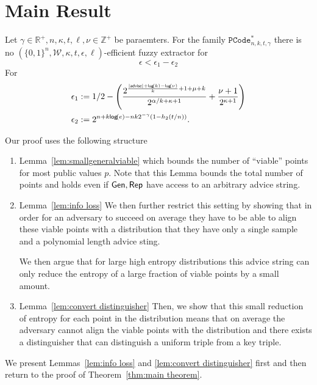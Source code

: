 

\section{Main Result}
\begin{theorem}
Let $\gamma \in\mathbb{R}^+, n, \kappa, t, \ell, \nu \in\mathbb{Z}^+$ be paraemters.
For the  family $ \mathtt{PCode}_{n, k, t, \gamma}^{*}$ there is no $(\{0,1\}^n, \mathcal{W}, \kappa, t, \epsilon, \ell)$-efficient fuzzy extractor for 
\[
\epsilon< \epsilon_1-\epsilon_2
\]
For 
\begin{align*}\epsilon_1&:= 1/2-\left(\frac{2^{\frac{|{\mathsf{advise}}|+\mathsf{log}\!\left(k\right)-\mathsf{log}\!\left(\nu\right)}{k}+1+\mu+k}}{{2^{\alpha/k+\kappa+1}}}+\frac{\nu+1}{2^{\kappa+1}}\right)\\\epsilon_2 &:=2^{n+k\mathsf{log}\!\left(e\right)- nk2^{-\gamma}(1-h_2(t/n))}.\end{align*}
\label{thm:main theorem}
\end{theorem}

Our proof uses the following structure
\begin{enumerate}
\item Lemma~\ref{lem:smallgeneralviable} which bounds the number of ``viable'' points for most public values $p$.  Note that this Lemma bounds the total number of points and holds even if ${\mathsf{Gen}}, {\mathsf{Rep}}$ have access to an arbitrary advice string.
\item Lemma~\ref{lem:info loss} We then further restrict this setting by showing that in order for an adversary to succeed on average they have to be able to align these viable points with a distribution that they have only a single sample and a polynomial length advice sting. 

 We then argue that for large high entropy distributions this advice string can only reduce the entropy of a large fraction of viable points by a small amount. 
\item Lemma~\ref{lem:convert distinguisher} Then, we show that this small reduction of entropy for each point in the distribution means that on average the adversary cannot align the viable points with the distribution and there exists a distinguisher that can distinguish a uniform triple from a key triple. 
\end{enumerate}

\noindent
We present Lemmas~\ref{lem:info loss} and \ref{lem:convert distinguisher} first and then return to the proof of Theorem~\ref{thm:main theorem}.


